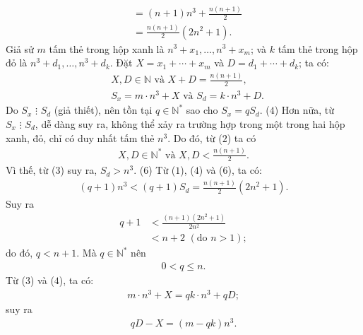 \begin{multicols}{2}
\begin{align*}
		&= \left( {n + 1} \right){n^3} + \frac{{n\left( {n + 1} \right)}}{2} \\
		&= \frac{{n\left( {n + 1} \right)}}{2}\left( {2{n^2} + 1} \right). \tag{$1$}
	\end{align*}
	Giả sử $m$ tấm thẻ trong hộp xanh là \linebreak ${n^3} + {x_1}, \ldots ,  {n^3} + {x_m}$; và $k$ tấm thẻ trong hộp đỏ là   ${n^3} + {d_1},\ldots,{n^3} + {d_k}$.
	\vskip 0.05cm
	Đặt $X = {x_1} +  \cdots  + {x_m}$  và  $D = {d_1} +  \cdots  + {d_k}$; ta có:
	\begin{align*}
		&X, D \in \mathbb{N} \text{ và }  X + D = \frac{{n\left( {n + 1} \right)}}{2}, \tag{$2$}\\
		&{S_x} = m \cdot {n^3} + X \text{ và } {S_d} = k \cdot {n^3} + D. \tag{$3$}
	\end{align*}
	Do ${S_x} \,\,\vdots\,\, {S_d}$  (giả thiết), nên tồn tại $q \in \mathbb{N^*}$  sao cho ${S_x} = q{S_d}$. \hfill ($4$)
	\vskip 0.05cm                                                               
	Hơn nữa, từ ${S_x} \,\,\vdots\,\, {S_d}$, dễ dàng suy ra, không thể xảy ra trường hợp trong một trong hai hộp xanh, đỏ, chỉ có duy nhất tấm thẻ $n^3$.  Do đó, từ ($2$) ta có
	\begin{align*}
		X, D \in \mathbb{N^*} \text{ và } X,D < \frac{{n\left( {n + 1} \right)}}{2}. \tag{$5$}
	\end{align*}   
	Vì thế, từ ($3$) suy ra,   ${S_d} > {n^3}.$         \hfill ($6$)
	\vskip 0.05cm
	Từ ($1$), ($4$) và ($6$), ta có:
	\begin{align*}
		\left( {q \!+\! 1} \right){n^3} \!<\! \left( {q \!+\! 1} \right){S_d} \!=\! \frac{{n\left( {n \!+\! 1} \right)}}{2}\left( {2{n^2} \!+\! 1} \right).
	\end{align*}
	Suy ra
	\begin{align*}
		q + 1 &< \frac{{\left( {n + 1} \right)\left( {2{n^2} + 1} \right)}}{{2{n^2}}} \\
		&< n + 2 \,\,(\text{do } n >1);
	\end{align*}
	do đó, $q < n + 1$. Mà  $q \in \mathbb{N^*}$ nên 
	\begin{align*}
		0 < q \le n. \tag{$7$}
	\end{align*}
	Từ ($3$) và ($4$), ta có:
	\begin{align*}
		m \cdot {n^3} + X = qk \cdot {n^3} + qD;
	\end{align*}
	suy ra
	\begin{align*}
		qD - X = \left( {m - qk} \right){n^3}. \tag{$8$}
	\end{align*}

\end{multicols}
